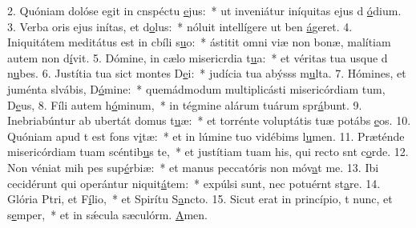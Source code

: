 2. Quóniam dolóse egit in cnspéctu \uline{e}jus:~* ut inveniátur iníquitas ejus d \uline{ó}dium.
3. Verba oris ejus inítas, et d\uline{o}lus:~* nóluit intellígere ut ben \uline{á}geret.
4. Iniquitátem meditátus est in cbíli s\uline{u}o:~* ástitit omni viæ non bonæ, malítiam autem non d\uline{í}vit.
5. Dómine, in cælo misericrdia t\uline{u}a:~* et véritas tua usque d n\uline{u}bes.
6. Justítia tua sict montes D\uline{e}i:~* judícia tua abýsss m\uline{u}lta.
7. Hómines, et juménta slvábis, D\uline{ó}mine:~* quemádmodum multiplicásti misericórdiam tum, D\uline{e}us,
8. Fíli autem h\uline{ó}minum,~* in tégmine alárum tuárum spr\uline{á}bunt.
9. Inebriabúntur ab ubertát domus t\uline{u}æ:~* et torrénte voluptátis tuæ potábs \uline{e}os.
10. Quóniam apud t est fons v\uline{i}tæ:~* et in lúmine tuo vidébims l\uline{u}men.
11. Præténde misericórdiam tuam scéntib\uline{u}s te,~* et justítiam tuam his, qui recto snt c\uline{o}rde.
12. Non véniat mih pes sup\uline{é}rbiæ:~* et manus peccatóris non móv\uline{a}t me.
13. Ibi cecidérunt qui operántur niquit\uline{á}tem:~* expúlsi sunt, nec potuérnt st\uline{a}re.
14. Glória Ptri, et F\uline{í}lio,~* et Spirítu S\uline{a}ncto.
15. Sicut erat in princípio, t nunc, et s\uline{e}mper,~* et in sǽcula sæculórm. \uline{A}men.
